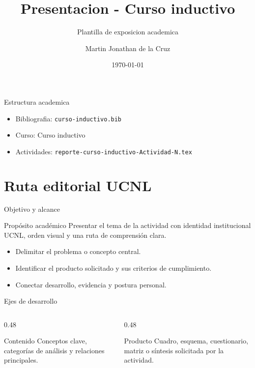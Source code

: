 ﻿\documentclass[spanish,aspectratio=169]{beamer}
\title{Presentacion - Curso inductivo}
\subtitle{Plantilla de exposicion academica}
\author{Martin Jonathan de la Cruz}
\institute{Universidad Ciudadana de Nuevo Leon}
\date{\today}
\begin{document}
\begin{frame}
  \titlepage
\end{frame}

\begin{frame}{Estructura academica}
  \begin{itemize}
    \item Bibliografia: \texttt{curso-inductivo.bib}
    \item Curso: Curso inductivo
    \item Actividades: \texttt{reporte-curso-inductivo-Actividad-N.tex}
  \end{itemize}
\end{frame}


\section{Ruta editorial UCNL}

\begin{frame}{Objetivo y alcance}
  \begin{block}{Propósito académico}
    Presentar el tema de la actividad con identidad institucional UCNL, orden visual y una ruta de comprensión clara.
  \end{block}
  \begin{itemize}
    \item Delimitar el problema o concepto central.
    \item Identificar el producto solicitado y sus criterios de cumplimiento.
    \item Conectar desarrollo, evidencia y postura personal.
  \end{itemize}
\end{frame}

\begin{frame}{Ejes de desarrollo}
  \begin{columns}[T,totalwidth=\textwidth]
    \begin{column}{0.48\textwidth}
      \begin{block}{Contenido}
        Conceptos clave, categorías de análisis y relaciones principales.
      \end{block}
    \end{column}
    \begin{column}{0.48\textwidth}
      \begin{block}{Producto}
        Cuadro, esquema, cuestionario, matriz o síntesis solicitada por la actividad.
      \end{block}
    \end{column}
  \end{columns}
\end{frame}
\end{document}
